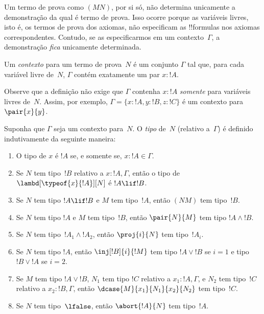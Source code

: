 \documentclass[../../../include/open-logic-section]{subfiles}
\begin{document}


Um termo de prova como $(MN)$, por si só, não determina unicamente a
demonstração da qual é termo de prova. Isso ocorre porque as variáveis
livres, isto é, os termos de prova dos axiomas, não especificam as
!!{formula}s nos axiomas correspondentes. Contudo, se as especificarmos
em um contexto~$\Gamma$, a demonstração \emph{fica} unicamente
determinada.

\begin{defn}
Um \emph{contexto} para um termo de prova~$N$ é um conjunto $\Gamma$ tal
que, para cada variável livre de~$N$, $\Gamma$ contém exatamente um par
$x : !A$.
\end{defn}

Observe que a definição não exige que $\Gamma$ contenha $x:!A$
\emph{somente} para variáveis livres de~$N$. Assim, por exemplo,
$\Gamma = \{x:!A, y:!B, z:!C\}$ é um contexto para $\pair{x}{y}$.

\begin{defn}
  Suponha que $\Gamma$ seja um contexto para~$N$. O \emph{tipo} de~$N$
  (relativo a~$\Gamma$) é definido indutivamente da seguinte maneira:
  \begin{enumerate}
  \item O tipo de $x$ é $!A$ se, e somente se, $x:!A \in \Gamma$.
  \item Se $N$ tem tipo~$!B$ relativo a $x:!A, \Gamma$, então o tipo de $\lambd[\typeof{x}{!A}][N]$ é $!A \lif !B$.
  \item Se $N$ tem tipo $!A \lif !B$ e $M$ tem tipo~$!A$, então $(NM)$
  tem tipo~$!B$.
  \item Se $N$ tem tipo $!A$ e $M$ tem tipo~$!B$, então $\pair{N}{M}$
  tem tipo $!A \land !B$.
  \item Se $N$ tem tipo~$!A_1 \land !A_2$, então $\proj{i}{N}$ tem tipo~$!A_i$.
  \item Se $N$ tem tipo $!A$, então
    $\inj[!B]{i}{!M}$ tem tipo $!A \lor !B$ se $i=1$ e tipo $!B \lor
    !A$ se $i=2$.
  \item Se $M$ tem tipo $!A \lor !B$, $N_1$ tem tipo $!C$ relativo
  a $x_1:!A, \Gamma$, e $N_2$ tem tipo~$!C$ relativo a $x_2:!B,
  \Gamma$, então $\dcase{M}{x_1}{N_1}{x_2}{N_2}$ tem tipo~$!C$.
  \item Se $N$ tem tipo~$\lfalse$, então
    $\abort{!A}{N}$ tem tipo~$!A$.
  \end{enumerate}
\end{defn}
\end{document}
